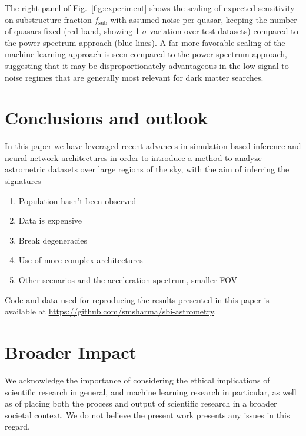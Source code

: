 \documentclass[]{article}
\begin{document}
The right panel of Fig.~\ref{fig:experiment} shows the scaling of expected sensitivity on substructure fraction $f_\mathrm{sub}$ with assumed noise per quasar, keeping the number of quasars fixed (red band, showing 1-$\sigma$ variation over test datasets) compared to the power spectrum approach (blue lines). A far more favorable scaling of the machine learning approach is seen compared to the power spectrum approach, suggesting that it may be disproportionately advantageous in the low signal-to-noise regimes that are generally most relevant for dark matter searches.

\section{Conclusions and outlook}
\label{sec:conclusions}

In this paper we have leveraged recent advances in simulation-based inference and neural network architectures in order to introduce a method to analyze astrometric datasets over large regions of the sky, with the aim of inferring the signatures 

\begin{enumerate}
    \item Population hasn't been observed
    \item Data is expensive
    \item Break degeneracies
    \item Use of more complex architectures
    \item Other scenarios and the acceleration spectrum, smaller FOV
\end{enumerate}

Code and data used for reproducing the results presented in this paper is available at \url{https://github.com/smsharma/sbi-astrometry}.

\section*{Broader Impact}
\label{sec:impact}


We acknowledge the importance of considering the ethical implications of scientific research in general, and machine learning research in particular, as well as of placing both the process and output of scientific research in a broader societal context. We do not believe the present work presents any issues in this regard. 
\end{document}
